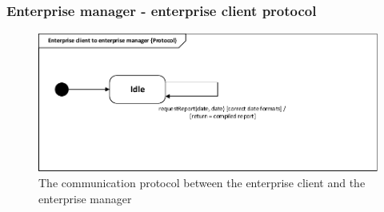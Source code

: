 \subsubsection*{Enterprise manager - enterprise client protocol}
\begin{figure}[H]
\centering
\includegraphics[width=0.7\linewidth]{img/behaviour_state_machines/protocol_state_machines/protocol_state_machine_enterprise_client_enterprise_manager}
\caption{The communication protocol between the enterprise client and the enterprise manager}
\label{fig:protocol_state_machine_enterprise_client_enterprise_manager}
\end{figure}